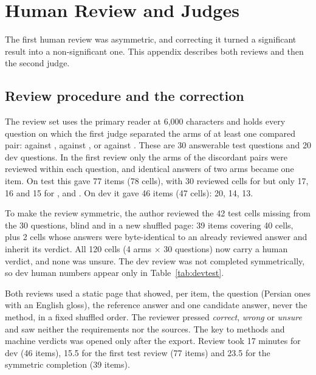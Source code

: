 \section{Human Review and Judges}
\label{app:review}

The first human review was asymmetric, and correcting it turned a significant result into a non-significant one. This appendix describes both reviews and then the second judge.

\subsection{Review procedure and the correction}
The review set uses the primary reader at 6,000 characters and holds every question on which the first judge separated the arms of at least one compared pair: \lexb{} against \hybrid, \lexb{} against \hr, or \setr{} against \lexb. These are 30 answerable test questions and 20 dev questions. In the first review only the arms of the discordant pairs were reviewed within each question, and identical answers of two arms became one item. On test this gave 77 items (78 cells), with 30 reviewed cells for \lexb{} but only 17, 16 and 15 for \hybrid, \hr{} and \setr. On dev it gave 46 items (47 cells): \lexb{} 20, \hybrid{} 14, \hr{} 13.

To make the review symmetric, the author reviewed the 42 test cells missing from the 30 questions, blind and in a new shuffled page: 39 items covering 40 cells, plus 2 cells whose answers were byte-identical to an already reviewed answer and inherit its verdict. All 120 cells (4 arms $\times$ 30 questions) now carry a human verdict, and none was unsure. The dev review was not completed symmetrically, so dev human numbers appear only in Table~\ref{tab:devtest}.

Both reviews used a static page that showed, per item, the question (Persian ones with an English gloss), the reference answer and one candidate answer, never the method, in a fixed shuffled order. The reviewer pressed \emph{correct}, \emph{wrong} or \emph{unsure} and saw neither the requirements nor the sources. The key to methods and machine verdicts was opened only after the export. Review took 17 minutes for dev (46 items), 15.5 for the first test review (77 items) and 23.5 for the symmetric completion (39 items).

